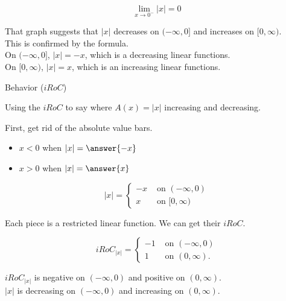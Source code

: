 \documentclass{ximera}
\begin{document}
\[
\lim\limits_{x \to 0^-} |x| = 0
\]






That graph suggests that $|x|$ decreases on $(-\infty, 0]$  and  increases on $[0, \infty )$.  \\

This is confirmed by the formula. \\


On $(-\infty, 0]$, $|x| = -x$, which is a decreasing linear functions. \\


On $[0, \infty)$, $|x| = x$, which is an increasing linear functions. \\


\begin{example}  Behavior ($iRoC$)


Using the $iRoC$ to say where $A(x) = | x |$ increasing and decreasing. \\



\begin{explanation}


First, get rid of the absolute value bars.

\begin{itemize}
\item $x < 0$ when $|x| = \answer{-x}$
\item $x > 0$ when $|x| = \answer{x}$
\end{itemize}



\[
|x| = 
\begin{cases}
  -x & \text{ on } (-\infty, 0)   \\
  x  & \text{ on } [0, \infty)
\end{cases}
\]



Each piece is a restricted linear function.  We can get their $iRoC$.


\[
iRoC_{|x|} = 
\begin{cases}
  -1 & \text{ on } (-\infty, 0)   \\
  1  & \text{ on } (0, \infty).
\end{cases}
\]

$iRoC_{|x|}$ is negative on $(-\infty, 0)$ and positive on $(0, \infty)$. \\


$| x |$ is decreasing on $(-\infty, 0)$ and increasing on $(0, \infty)$.



\end{explanation}


\end{example}
\end{document}
